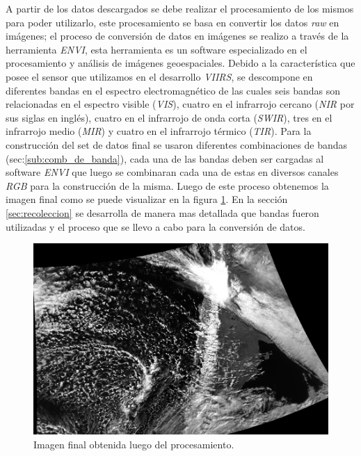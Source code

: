 %
A partir de los datos descargados  se debe realizar el procesamiento de los mismos para poder utilizarlo, este procesamiento se basa en convertir los datos \textit{raw} en imágenes; el proceso de conversión de datos en imágenes se realizo a través de la herramienta \textit{ENVI}, esta herramienta es un software  especializado en el procesamiento y análisis de imágenes  geoespaciales. Debido a la característica que posee el sensor que utilizamos en el desarrollo \textit{VIIRS}, se descompone en diferentes bandas en el espectro electromagnético de las cuales seis bandas son relacionadas en el espectro visible (\textit{VIS}), cuatro en el infrarrojo cercano (\textit{NIR} por sus siglas en inglés), cuatro en el infrarrojo de onda corta (\textit{SWIR}), tres en el infrarrojo medio (\textit{MIR}) y cuatro en el infrarrojo térmico (\textit{TIR}). Para la construcción del set de datos final se usaron diferentes combinaciones de bandas (sec:\ref{sub:comb_de_banda}), cada una de las bandas deben ser cargadas al software \textit{ENVI} que luego se combinaran cada una de estas en diversos canales \textit{RGB} para la construcción de la misma. Luego de este proceso obtenemos la imagen final como se puede visualizar en la figura \ref{Fig:img-final}. En la sección \ref{sec:recoleccion} se desarrolla de manera mas detallada que bandas fueron utilizadas y el proceso que se llevo a cabo para la conversión de datos.

\begin{figure}[H] \centering
  \includegraphics[scale=0.4,keepaspectratio=true,clip=true]{imagenes/tbd/pre-img.png}
  \caption{Imagen final obtenida luego del procesamiento.}\label{Fig:img-final}
\end{figure}


